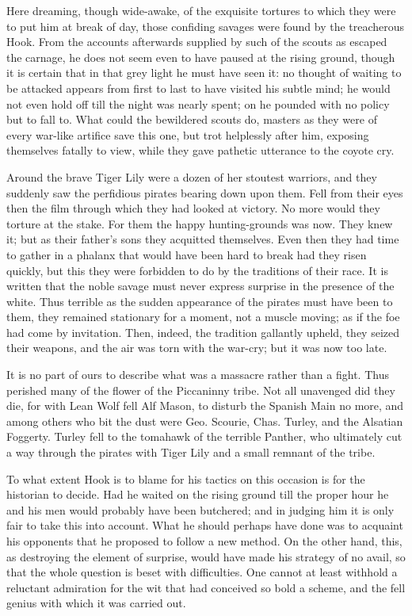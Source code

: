 Here dreaming, though wide-awake, of the exquisite tortures to which they
were to put him at break of day, those confiding savages were found by the
treacherous Hook. From the accounts afterwards supplied by such of the
scouts as escaped the carnage, he does not seem even to have paused at the
rising ground, though it is certain that in that grey light he must have
seen it: no thought of waiting to be attacked appears from first to last
to have visited his subtle mind; he would not even hold off till the night
was nearly spent; on he pounded with no policy but to fall to. What could the bewildered scouts do, masters as they were of
every war-like artifice save this one, but trot helplessly after him,
exposing themselves fatally to view, while they gave pathetic utterance to
the coyote cry.


Around the brave Tiger Lily were a dozen of her stoutest warriors, and
they suddenly saw the perfidious pirates bearing down upon them. Fell from
their eyes then the film through which they had looked at victory. No more
would they torture at the stake. For them the happy hunting-grounds was
now. They knew it; but as their father's sons they acquitted themselves.
Even then they had time to gather in a phalanx that
would have been hard to break had they risen quickly, but this they were
forbidden to do by the traditions of their race. It is written that the
noble savage must never express surprise in the presence of the white.
Thus terrible as the sudden appearance of the pirates must have been to
them, they remained stationary for a moment, not a muscle moving; as if
the foe had come by invitation. Then, indeed, the tradition gallantly
upheld, they seized their weapons, and the air was torn with the war-cry;
but it was now too late.


It is no part of ours to describe what was a massacre rather than a fight.
Thus perished many of the flower of the Piccaninny tribe. Not all
unavenged did they die, for with Lean Wolf fell Alf Mason, to disturb the
Spanish Main no more, and among others who bit the dust were Geo. Scourie,
Chas. Turley, and the Alsatian Foggerty. Turley fell to the tomahawk of
the terrible Panther, who ultimately cut a way through the pirates with
Tiger Lily and a small remnant of the tribe.


To what extent Hook is to blame for his tactics on this occasion is for
the historian to decide. Had he waited on the rising ground till the
proper hour he and his men would probably have been butchered; and in
judging him it is only fair to take this into account. What he should
perhaps have done was to acquaint his opponents that he proposed to follow
a new method. On the other hand, this, as destroying the element of
surprise, would have made his strategy of no avail, so that the whole
question is beset with difficulties. One cannot at least withhold a
reluctant admiration for the wit that had conceived so bold a scheme, and
the fell genius with which it was carried out.


